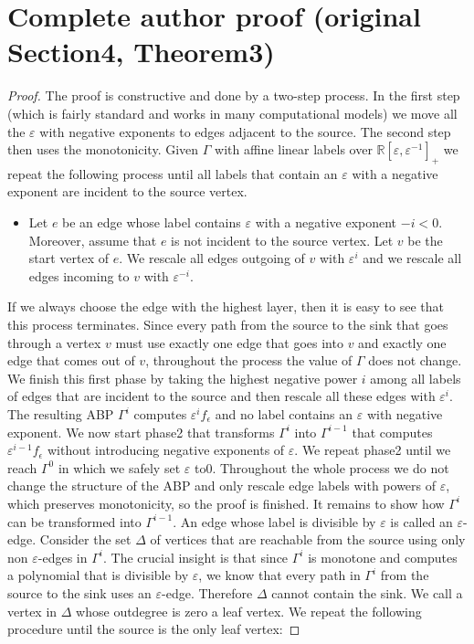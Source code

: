 \documentclass[10pt,a4paper]{article}
\newcommand{\R}{\mathbb R}
\begin{document}
\section*{Complete author proof (original Section4, Theorem3)}
\begin{proof}
The proof is constructive and done by a two-step process. In the first step (which is fairly standard and works in many computational models) we move all the $\varepsilon$ with negative exponents to edges adjacent to the source. The second step then uses the monotonicity.
Given $\Gamma$ with affine linear labels over $\R[\varepsilon,\varepsilon^{-1}]_+$ we repeat the following process until all labels that contain an $\varepsilon$ with a negative exponent are incident to the source vertex.
\begin{itemize}
\item Let $e$ be an edge whose label contains $\varepsilon$ with a negative exponent $-i<0$. Moreover, assume that $e$ is not incident to the source vertex. Let $v$ be the start vertex of $e$. We rescale all edges outgoing of $v$ with $\varepsilon^i$ and we rescale all edges incoming to $v$ with $\varepsilon^{-i}$.
\end{itemize}
If we always choose the edge with the highest layer, then it is easy to see that this process terminates. Since every path from the source to the sink that goes through a vertex $v$ must use exactly one edge that goes into $v$ and exactly one edge that comes out of $v$, throughout the process the value of $\Gamma$ does not change. We finish this first phase by taking the highest negative power $i$ among all labels of edges that are incident to the source and then rescale all these edges with $\varepsilon^i$. The resulting ABP $\Gamma^i$ computes $\varepsilon^if_\epsilon$ and no label contains an $\varepsilon$ with negative exponent. We now start phase2 that transforms $\Gamma^i$ into $\Gamma^{i-1}$ that computes $\varepsilon^{i-1}f_\epsilon$ without introducing negative exponents of $\varepsilon$. We repeat phase2 until we reach $\Gamma^0$ in which we safely set $\varepsilon$ to0. Throughout the whole process we do not change the structure of the ABP and only rescale edge labels with powers of $\varepsilon$, which preserves monotonicity, so the proof is finished. It remains to show how $\Gamma^i$ can be transformed into $\Gamma^{i-1}$. An edge whose label is divisible by $\varepsilon$ is called an $\varepsilon$-edge. Consider the set $\Delta$ of vertices that are reachable from the source using only non $\varepsilon$-edges in $\Gamma^i$. The crucial insight is that since $\Gamma^i$ is monotone and computes a polynomial that is divisible by $\varepsilon$, we know that every path in $\Gamma^i$ from the source to the sink uses an $\varepsilon$-edge. Therefore $\Delta$ cannot contain the sink. We call a vertex in $\Delta$ whose outdegree is zero a leaf vertex. We repeat the following procedure until the source is the only leaf vertex:

\end{proof}
\end{document}
